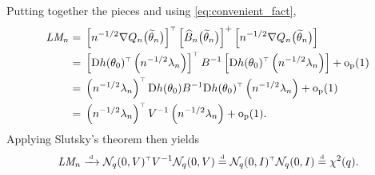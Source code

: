 \documentclass[11pt,letterpaper,reqno,oneside]{article}
\begin{document}
Putting together the pieces and using \eqref{eq:convenient_fact},
%
\begin{align*}
	\textit{LM}_n
	={}& \left[ n^{-1/2} \nabla Q_n\bigl( \widetilde{\theta}_n \bigr) \right]^{\scriptscriptstyle \top}
	\left[ \widehat{B}_n\bigl( \widetilde{\theta}_n \bigr) \right]^+
	\left[ n^{-1/2} \nabla Q_n\bigl( \widetilde{\theta}_n \bigr) \right]
	\\
	={}& \left[ \mathrm{D} h(\theta_0)^{\scriptscriptstyle \top} \left( n^{-1/2} \lambda_n \right) \right]^{\scriptscriptstyle \top}
	B^{-1}
	\left[ \mathrm{D} h(\theta_0)^{\scriptscriptstyle \top} \left( n^{-1/2} \lambda_n \right) \right]
	+ \mathrm{o}_{\mathrm{p}}(1)
	\\
	={}& \left( n^{-1/2} \lambda_n \right)^{\scriptscriptstyle \top}
	\mathrm{D} h(\theta_0) B^{-1} \mathrm{D} h(\theta_0)^{\scriptscriptstyle \top}
	\left( n^{-1/2} \lambda_n \right)
	+ \mathrm{o}_{\mathrm{p}}(1)
	\\
	={}& \left( n^{-1/2} \lambda_n \right)^{\scriptscriptstyle \top}
	V^{-1}
	\left( n^{-1/2} \lambda_n \right)
	+ \mathrm{o}_{\mathrm{p}}(1) .
\end{align*}
%
Applying Slutsky's theorem then yields
%
\begin{equation*}
	\textit{LM}_n
	\xrightarrow{{\scriptscriptstyle \mathrm{\;d\;}}} \mathcal{N}_q(0,V)^{\scriptscriptstyle \top}
	V^{-1}
	\mathcal{N}_q(0,V)
	\protect\overset{{\scriptscriptstyle \mathrm{d}}}{=} \mathcal{N}_q(0,I)^{\scriptscriptstyle \top} \mathcal{N}_q(0,I)
	\protect\overset{{\scriptscriptstyle \mathrm{d}}}{=} \chi^2(q) .
\end{equation*}
\end{document}

